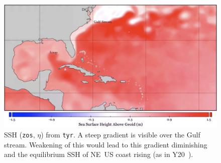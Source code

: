 
\begin{figure}
\includegraphics[width=\linewidth]{images/example-images/zos-image.png}
\caption{SSH (\texttt{zos}, $\eta$) from \texttt{tyr}.
A steep gradient is visible over the Gulf stream. Weakening of this
would lead to this gradient diminishing and the equilibrium SSH of NE~US coast
rising (as in Y20~\cite{ZannaPreprint}).}
\label{fig:zos}
\end{figure}

